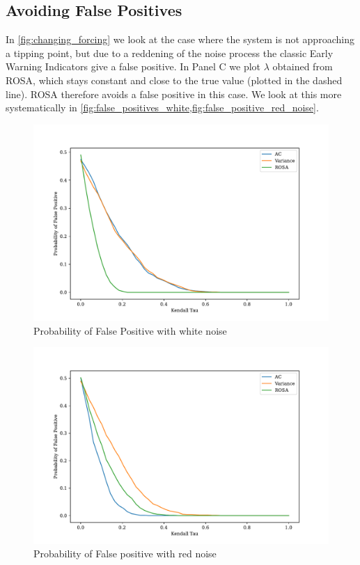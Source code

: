 \subsection{Avoiding False Positives}
In \cref{fig:changing_forcing} we look at the case where the 
system is not approaching a tipping point, but due to a reddening of 
the noise process the classic Early Warning Indicators give a 
false positive. In Panel C we plot $\lambda$ obtained from ROSA, which stays constant and close to the true
value (plotted in the dashed line). ROSA therefore avoids a false positive in this case. We look at this more
systematically in \cref{fig:false_positives_white,fig:false_positive_red_noise}.
\begin{figure}
  \centering
  \includegraphics[width=\textwidth]{false_positives_whitenoise}
  \caption[False positive with white noise]{Probability of False Positive with white noise}
  \label{fig:false_positives_white}
\end{figure}
\begin{figure}
  \centering
  \includegraphics[width=\textwidth]{false_positives_rednoise}
  \caption[False positive with red noise]{Probability of False positive with red noise}
  \label{fig:false_positive_red_noise}
\end{figure}


